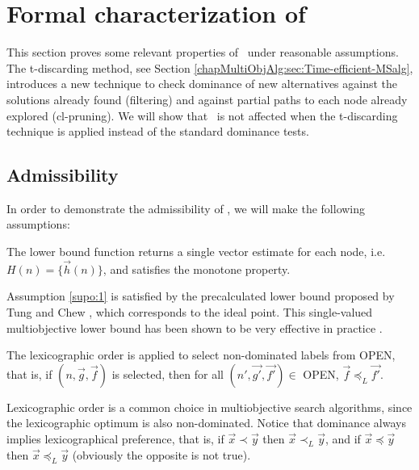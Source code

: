 \section{Formal characterization of \texorpdfstring{\namoate}{NAMOA*te}}
\label{chapFormalAnalysis:sec:analysisNAMOATE}

This section proves some relevant properties of \namoate \ under reasonable assumptions. The t-discarding method, see Section \ref{chapMultiObjAlg:sec:Time-efficient-MSalg}, introduces a new technique to check dominance of new alternatives against the solutions already found (filtering) and against partial paths to each node already explored (cl-pruning). We will show that \namoa \ is not affected when the t-discarding technique is applied instead of the standard dominance tests. 

\subsection{Admissibility}
\label{chapFormalAnalysis:sec:admissibilityNamoate}

In order to demonstrate the admissibility of \namoate, we will make the following assumptions:

\begin{supo} \label{supo:1}
The lower bound function returns a single vector estimate for each node, i.e. $H(n) = \{  \vec h(n) \}$, and satisfies the monotone property.
\end{supo}
Assumption \ref{supo:1} is satisfied by the precalculated lower bound proposed by Tung and Chew \citep{Tung1992}, which corresponds to the ideal point. This single-valued multiobjective lower bound has been shown to be very effective in practice \citep{Machuca2011b}.


\begin{supo} \label{supo:2}
The lexicographic order is applied to select non-dominated labels
from OPEN, that is, if $(n,\vec g,\vec f)$ is selected, then for all $(n',\vec{g'},\vec{f'})\in$ OPEN, $\vec f \preceq_L \vec{f'}$. 
\end{supo}

Lexicographic order is a common choice in multiobjective search algorithms, since the lexicographic optimum is also non-dominated. Notice that dominance always implies lexicographical preference, that is,
if $\vec x \prec \vec y$ then $\vec x \prec_L \vec y$, and if $\vec x \preceq \vec y$ then $\vec x \preceq_L \vec y$
(obviously the opposite is not true).

